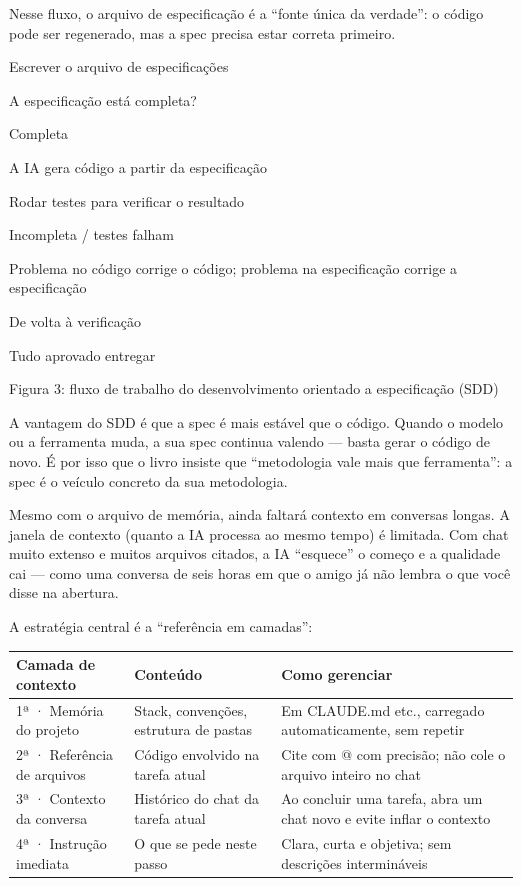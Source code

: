 Nesse fluxo, o arquivo de especificação é a “fonte única da verdade”: o código pode ser regenerado, mas a spec precisa estar correta primeiro.

Escrever o arquivo de especificações

A especificação está completa?

Completa

A IA gera código a partir da especificação

Rodar testes para verificar o resultado

Incompleta / testes falham

Problema no código corrige o código; problema na especificação corrige a especificação

De volta à verificação

Tudo aprovado entregar

\begin{center}\small\color{gray}Figura 3: fluxo de trabalho do desenvolvimento orientado a especificação (SDD)\end{center}

A vantagem do SDD é que a spec é mais estável que o código. Quando o modelo ou a ferramenta muda, a sua spec continua valendo — basta gerar o código de novo. É por isso que o livro insiste que “metodologia vale mais que ferramenta”: a spec é o veículo concreto da sua metodologia.


Mesmo com o arquivo de memória, ainda faltará contexto em conversas longas. A janela de contexto (quanto a IA processa ao mesmo tempo) é limitada. Com chat muito extenso e muitos arquivos citados, a IA “esquece” o começo e a qualidade cai — como uma conversa de seis horas em que o amigo já não lembra o que você disse na abertura.

A estratégia central é a “referência em camadas”:

\begin{center}
\begin{tabularx}{\linewidth}{|X|X|X|}
\hline
\textbf{Camada de contexto} & \textbf{Conteúdo} & \textbf{Como gerenciar} \tabularnewline
\hline
1ª · Memória do projeto & Stack, convenções, estrutura de pastas & Em CLAUDE.md etc., carregado automaticamente, sem repetir \tabularnewline
2ª · Referência de arquivos & Código envolvido na tarefa atual & Cite com @ com precisão; não cole o arquivo inteiro no chat \tabularnewline
3ª · Contexto da conversa & Histórico do chat da tarefa atual & Ao concluir uma tarefa, abra um chat novo e evite inflar o contexto \tabularnewline
4ª · Instrução imediata & O que se pede neste passo & Clara, curta e objetiva; sem descrições intermináveis \tabularnewline
\hline
\end{tabularx}
\end{center}

